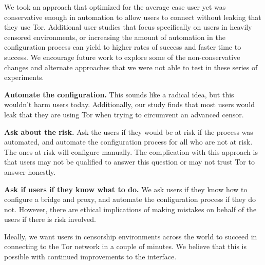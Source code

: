 \documentclass[USenglish,oneside,twocolumn]{article}
\begin{document}
We took an approach that optimized for the average case user yet was conservative enough in automation to allow users to connect without leaking that they use Tor. Additional user studies that focus specifically on users in heavily censored environments, or increasing the amount of automation in the configuration process can yield to higher rates of success and faster time to success. We encourage future work to explore some of the non-conservative changes and alternate approaches that we were not able to test in these series of experiments.\\

\begin{description}
\item{\bfseries Automate the configuration.} This sounds like a radical idea, but this wouldn't harm users today. Additionally, our study finds that most users would leak that they are using Tor when trying to circumvent an advanced censor. 
\item{\bfseries Ask about the risk.} Ask the users if they would be at risk if the process was automated, and automate the configuration process for all who are not at risk. The ones at risk will configure manually. The complication with this approach is that users may not be qualified to answer this question or may not trust Tor to answer honestly. 
\item{\bfseries Ask if users if they know what to do.} We ask users if they know how to configure a bridge and proxy, and automate the configuration process if they do not. However, there are ethical implications of making mistakes on behalf of the users if there is risk involved. 
\end{description}

Ideally, we want users in censorship environments across the world to succeed in connecting to the Tor network in a couple of minutes. We believe that this is possible with continued improvements to the interface. 

\end{document}
